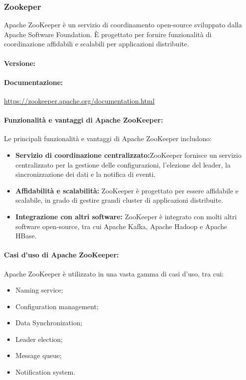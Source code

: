 \subsubsection{Zookeper}
Apache ZooKeeper è un servizio di coordinamento open-source sviluppato dalla Apache Software Foundation. È progettato per fornire funzionalità di coordinazione affidabili e scalabili per applicazioni distribuite.

\paragraph*{Versione:}


\paragraph*{Documentazione:}
\href{https://zookeeper.apache.org/documentation.html}{https://zookeeper.apache.org/documentation.html}
\paragraph*{Funzionalità e vantaggi di Apache ZooKeeper:}
Le principali funzionalità e vantaggi di Apache ZooKeeper includono:
\begin{itemize}
    \item \textbf{Servizio di coordinazione centralizzato:}ZooKeeper fornisce un servizio centralizzato per la gestione delle configurazioni, l'elezione del leader, la sincronizzazione dei dati e la notifica di eventi.
    \item \textbf{Affidabilità e scalabilità:} ZooKeeper è progettato per essere affidabile e scalabile, in grado di gestire grandi cluster di applicazioni distribuite.
    \item \textbf{Integrazione con altri software:} ZooKeeper è integrato con molti altri software open-source, tra cui Apache Kafka, Apache Hadoop e Apache HBase.
\end{itemize}
 
\paragraph*{Casi d'uso di Apache ZooKeeper:}

Apache ZooKeeper è utilizzato in una vasta gamma di casi d'uso, tra cui:
\begin{itemize}
    \item Naming service;
    \item Configuration management;
    \item Data Synchronization;
    \item Leader election;
    \item Message queue;
    \item Notification system.
\end{itemize}

